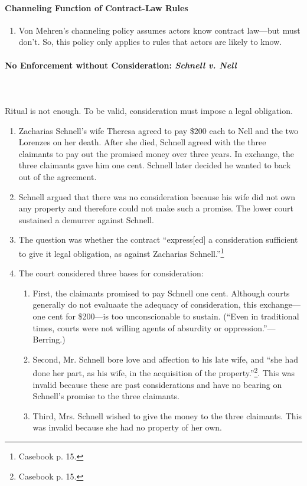 \paragraph{Channeling Function of Contract-Law Rules}

\begin{enumerate}
    \item Von Mehren's channeling policy assumes actors know contract 
    law---but must don't. So, this policy only applies to rules that actors 
    are likely to know. 
\end{enumerate}

\paragraph{No Enforcement without Consideration: \emph{Schnell v. Nell}}
~\\\\
Ritual is not enough. To be valid, consideration must impose a legal 
obligation.

\begin{enumerate}
    \item Zacharias Schnell's wife Theresa agreed to pay \$200 each to Nell and 
    the two Lorenzes on her death. After she died, Schnell agreed with the 
    three claimants to pay out the promised money over three years. In 
    exchange, the three claimants gave him one cent. Schnell later decided he 
    wanted to back out of the agreement.
    \item Schnell argued that there was no consideration because his wife did 
    not own any property and therefore could not make such a promise. The 
    lower court sustained a demurrer against Schnell.
    \item The question was whether the contract ``express[ed] a consideration 
    sufficient to give it legal obligation, as against Zacharias 
    Schnell.''\footnote{Casebook p. 15.}
    \item The court considered three bases for consideration:
    \begin{enumerate}
        \item First, the claimants promised to pay Schnell one cent. Although 
        courts generally do not evaluaate the adequacy of consideration, this 
        exchange---one cent for \$200---is too unconscionable to 
        sustain. (``Even in traditional times, courts were not willing agents 
        of absurdity or oppression.''---Berring.)
        \item Second, Mr. Schnell bore love and affection to his late wife, 
        and ``she had done her part, as his wife, in the acquisition of the 
        property.''\footnote{Casebook p. 15.}. This was invalid because these 
        are past considerations and have no bearing on Schnell's promise to 
        the three claimants.
        \item Third, Mrs. Schnell wished to give the money to the three 
        claimants. This was invalid because she had no property of her own.
    \end{enumerate}
\end{enumerate}

